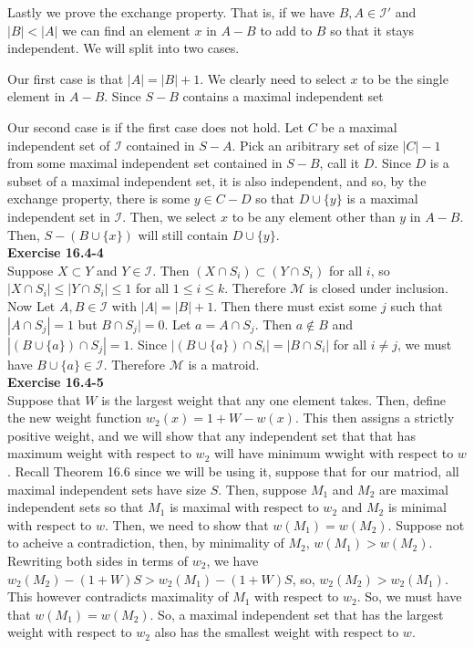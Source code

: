 \documentclass{article}
\begin{document}
Lastly we prove the exchange property. That is, if we have $B,A \in \mathcal{I}'$ and $|B|<|A|$ we can find an element $x$ in $A-B$ to add to $B$ so that it stays independent. We will split into two cases. 

Our first case is that $|A| = |B|+1$. We clearly need to select $x$ to be the single element in $A-B$. Since $S-B$ contains a maximal independent set

Our second case is if the first case does not hold. Let $C$ be a maximal independent set of $\mathcal{I}$ contained in $S-A$. Pick an aribitrary set of size $|C|-1$ from some maximal independent set contained in $S-B$, call it $D$. Since $D$ is a subset of a maximal independent set, it is also independent, and so, by the exchange property, there is some $y\in C-D$ so that $D\cup\{y\}$ is a maximal independent set in $\mathcal{I}$. Then, we select $x$ to be any element other than $y$ in $A-B$. Then, $S - (B\cup\{x\})$ will still contain $D\cup\{y\}$.\\

\noindent\textbf{Exercise 16.4-4}\\

Suppose $X \subset Y$ and $Y \in \mathcal{I}$.  Then $(X \cap S_i) \subset (Y \cap S_i)$ for all $i$, so $|X \cap S_i| \leq |Y \cap S_i| \leq 1$ for all $1 \leq i \leq k$. Therefore $\mathcal{M}$ is closed under inclusion.\\ 

Now Let $A, B \in \mathcal{I}$ with $|A| = |B| + 1$.  Then there must exist some $j$ such that $|A \cap S_j| = 1$ but $B \cap S_j| = 0$.  Let $a = A \cap S_j$.  Then $a \notin B$ and $|(B \cup \{a\}) \cap S_j| = 1$.  Since $|(B \cup \{a\}) \cap S_i| = |B \cap S_i|$ for all $i \neq j$, we must have $B \cup \{a\} \in \mathcal{I}$.  Therefore $\mathcal{M}$ is a matroid.\\

\noindent\textbf{Exercise 16.4-5}\\

Suppose that $W$ is the largest weight that any one element takes. Then, define the new weight function $w_2(x) = 1+ W - w(x)$. This then assigns a strictly positive weight, and we will show that any independent set that that has maximum weight with respect to $w_2$ will have minimum wwight with respect to $w$. Recall Theorem 16.6 since we will be using it, suppose that for our matriod, all maximal independent sets have size $S$. Then, suppose $M_1$ and $M_2$ are maximal independent sets so that $M_1$ is maximal with respect to $w_2$ and $M_2$ is minimal with respect to $w$. Then, we need to show that $w(M_1) = w(M_2)$. Suppose not to acheive a contradiction, then, by minimality of $M_2$, $w(M_1) > w (M_2)$. Rewriting both sides in terms of $w_2$, we have $w_2(M_2) - (1+W)S > w_2(M_1) - (1+W)S$, so, $w_2(M_2) > w_2(M_1)$. This however contradicts maximality of $M_1$ with respect to $w_2$. So, we must have that $w(M_1) = w(M_2)$. So, a maximal independent set that has the largest weight with respect to $w_2$ also has the smallest weight with respect to $w$.
\end{document}
